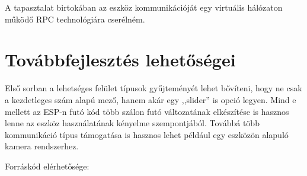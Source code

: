 \documentclass{thesis-ekf}
\theoremstyle{definition}
\theoremstyle{remark}
\begin{document}
	A tapasztalat birtokában az eszköz kommunikációját egy virtuális hálózaton működő RPC technológiára cserélném.
	\section*{Továbbfejlesztés lehetőségei}
	
	Első sorban a lehetséges felület típusok gyűjteményét lehet bővíteni, hogy ne csak a kezdetleges szám alapú mező, hanem akár egy ,,slider'' is opció legyen. Mind e mellett az ESP-n futó kód több szálon futó változatának elkészítése is hasznos lenne az eszköz használatának kényelme szempontjából. Továbbá több kommunikáció típus támogatása is hasznos lehet például egy eszközön alapuló kamera rendszerhez.
	\begin{center}
		Forráskód elérhetősége:\\
		{}
	\end{center}
	
\end{document}
